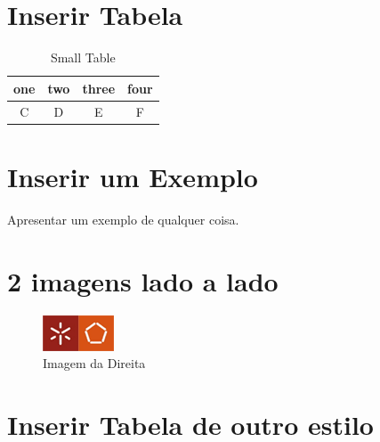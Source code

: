 \pagebreak

\section{Inserir Tabela}

\begin{table}[ht]
\caption{Small Table}
\centering
\begin{tabular}{cccc}
\hline
one&two&three&four\\
\hline
C&D&E&F\\
\hline
\end{tabular}
\end{table}


\section{Inserir um Exemplo}
\vskip6pt
\begin{example}
Apresentar um exemplo de qualquer coisa.
\end{example}


\section{2 imagens lado a lado}

\begin{figure}[ht]
{
\includegraphics[width=.5\textwidth]{images/dium}
\caption{Imagem da Direita}
}
\end{figure}


\section{Inserir Tabela de outro estilo}

